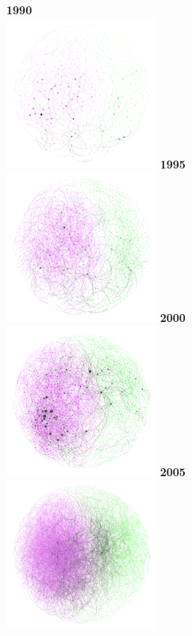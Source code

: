 \documentclass[10pt]{article}         %
\begin{document}
\begin{figure}[!htb]
  \textbf{1990}\\
  \includegraphics[width=5cm, height=5cm]{Fig2A1990.png}
\endminipage\hfill
{}
  \textbf{1995}\\
  \includegraphics[width=5cm, height=5cm]{Fig2A1995.png}
\endminipage\hfill
{}%
  \textbf{2000}\\
  \includegraphics[width=5cm, height=5cm]{Fig2A2000.png}
\endminipage\hfill
{}
  \textbf{2005}\\
  \includegraphics[width=5cm, height=5cm]{Fig2A2005.png}

\end{figure}
\end{document}
